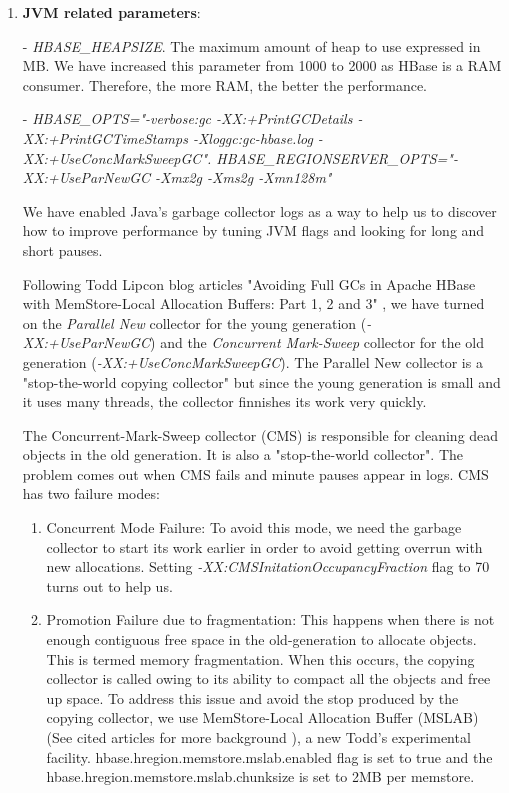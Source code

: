 \begin{enumerate}

\item \textbf{JVM related parameters}:
\bigskip

- \textit{HBASE\_HEAPSIZE}. The maximum amount of heap to use expressed in MB. We have increased this parameter from 1000 to 2000 as HBase is a RAM consumer. Therefore, the more RAM, the better the performance.
\par
- \textit{HBASE\_OPTS="-verbose:gc -XX:+PrintGCDetails -XX:+PrintGCTimeStamps -Xloggc:gc-hbase.log -XX:+UseConcMarkSweepGC".
  HBASE\_REGIONSERVER\_OPTS="-XX:+UseParNewGC -Xmx2g -Xms2g -Xmn128m"}
\par
We have enabled Java's garbage collector logs as a way to help us to discover how to improve performance by tuning JVM flags and looking for long and short pauses. 
\par
Following Todd Lipcon blog articles "Avoiding Full GCs in Apache HBase with MemStore-Local Allocation Buffers: Part 1, 2 and 3" , we have turned on the \textit{Parallel New} collector for the young generation (\textit{-XX:+UseParNewGC}) and the \textit{Concurrent Mark-Sweep} collector for the old generation (\textit{-XX:+UseConcMarkSweepGC}). The Parallel New collector is a "stop-the-world copying collector" but since the young generation is small and it uses many threads, the collector finnishes its work very quickly.
\par
The Concurrent-Mark-Sweep collector (CMS) is responsible for cleaning dead objects in the old generation. It is also a "stop-the-world collector". The problem comes out when CMS fails and minute pauses appear in logs. CMS has two failure modes:
\begin{enumerate}
\item Concurrent Mode Failure: To avoid this mode, we need the garbage collector to start its work earlier in order to avoid getting overrun with new allocations. Setting \textit{-XX:CMSInitationOccupancyFraction} flag to 70 turns out to help us.
\item Promotion Failure due to fragmentation: This happens when there is not enough contiguous free space in the old-generation to allocate objects. This is termed memory fragmentation. When this occurs, the copying collector is called owing to its ability to compact all the objects and free up space. To address this issue and avoid the stop produced by the copying collector, we use MemStore-Local Allocation Buffer (MSLAB) (See cited articles for more background \cite{ApacheHBaseMSLAB} \cite{MSLAB}), a new Todd's experimental facility.  hbase.hregion.memstore.mslab.enabled flag is set to true and the hbase.hregion.memstore.mslab.chunksize is set to 2MB per memstore.


\end{enumerate}
\end{enumerate}
